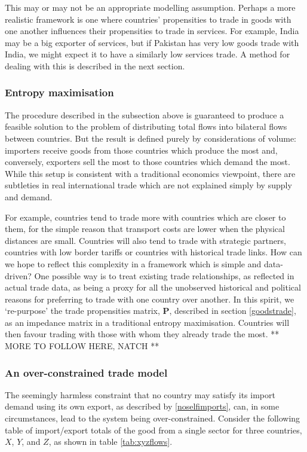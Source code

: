 \documentclass[preprint,authoryear,3p]{elsarticle}
\begin{document}
This may or may not be an appropriate modelling assumption. Perhaps a more realistic framework is one where countries' propensities to trade in goods with one another influences their propensities to trade in services. For example, India may be a big exporter of services, but if Pakistan has very low goods trade with India, we might expect it to have a similarly low services trade. A method for dealing with this is described in the next section.





\subsubsection{Entropy maximisation}
The procedure described in the subsection above is guaranteed to produce a feasible solution to the problem of distributing total flows into bilateral flows between countries. But the result is defined purely by considerations of volume: importers receive goods from those countries which produce the most and, conversely, exporters sell the most to those countries which demand the most. While this setup is consistent with a traditional economics viewpoint, there are subtleties in real international trade which are not explained simply by supply and demand.

For example, countries tend to trade more with countries which are closer to them, for the simple reason that transport costs are lower when the physical distances are small. Countries will also tend to trade with strategic partners, countries with low border tariffs or countries with historical trade links. How can we hope to reflect this complexity in a framework which is simple and data-driven? One possible way is to treat existing trade relationships, as reflected in actual trade data, as being a proxy for all the unobserved historical and political reasons for preferring to trade with one country over another. In this spirit, we `re-purpose' the trade propensities matrix, $\textbf{P}$, described in section \ref{goodstrade}, as an impedance matrix in a traditional entropy maximisation. Countries will then favour trading with those with whom they already trade the most. **  MORE TO FOLLOW HERE, NATCH **





\subsubsection{An over-constrained trade model}
The seemingly harmless constraint that no country may satisfy its import demand using its own export, as described by \eqref{noselfimports}, can, in some circumstances, lead to the system being over-constrained. Consider the following table of import/export totals of the good from a single sector for three countries, $X$, $Y$, and $Z$, as shown in table \ref{tab:xyzflows}.
\end{document}
